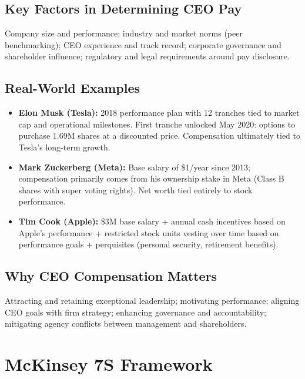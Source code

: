 \documentclass[11pt, letterpaper]{article}
\begin{document}
\subsection{Key Factors in Determining CEO Pay}

Company size and performance; industry and market norms (peer benchmarking); CEO experience and track record; corporate governance and shareholder influence; regulatory and legal requirements around pay disclosure.

\subsection{Real-World Examples}

\begin{itemize}[leftmargin=*]
  \item \textbf{Elon Musk (Tesla):} 2018 performance plan with 12 tranches tied to market cap and operational milestones. First tranche unlocked May 2020: options to purchase 1.69M shares at a discounted price. Compensation ultimately tied to Tesla's long-term growth.
  \item \textbf{Mark Zuckerberg (Meta):} Base salary of \$1/year since 2013; compensation primarily comes from his ownership stake in Meta (Class B shares with super voting rights). Net worth tied entirely to stock performance.
  \item \textbf{Tim Cook (Apple):} \$3M base salary + annual cash incentives based on Apple's performance + restricted stock units vesting over time based on performance goals + perquisites (personal security, retirement benefits).
\end{itemize}

\subsection{Why CEO Compensation Matters}

Attracting and retaining exceptional leadership; motivating performance; aligning CEO goals with firm strategy; enhancing governance and accountability; mitigating agency conflicts between management and shareholders.

\newpage

\section{McKinsey 7S Framework}
\end{document}
